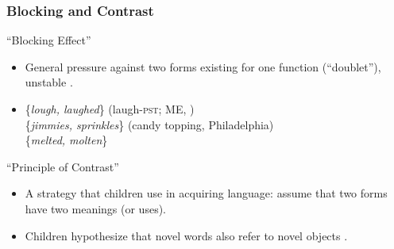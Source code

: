 \documentclass[hyperref={pdfpagelabels=false}]{beamer}
\begin{document}
\begin{frame}
\frametitle{Blocking and Contrast}
\begin{block}{``Blocking Effect'' \citep{aronoff1976}}
	\begin{itemize}
		\item General pressure against two forms existing for one function (``doublet''), unstable \citep{kroch1994}.
		\item[ ]\{\textsl{lough, laughed}\} (laugh-\textsc{pst}; ME, \citealt{taylor1994}) \\ \{\textsl{jimmies, sprinkles}\} (candy topping, Philadelphia)\\ \{\textsl{melted, molten}\}
	\end{itemize}
\end{block}
\begin{block}{``Principle of Contrast''}
	\begin{itemize}
		\item A strategy that children use in acquiring language: assume that two forms have two meanings (or uses)\citep[][{ \it inter alia}]{clark1987, clark1990}.
		\item Children hypothesize that novel words also refer to novel objects \citep[as in][among many other replications of the effect]{markmanwachtel1988}.
	\end{itemize}
\end{block}
\end{frame}
\end{document}
